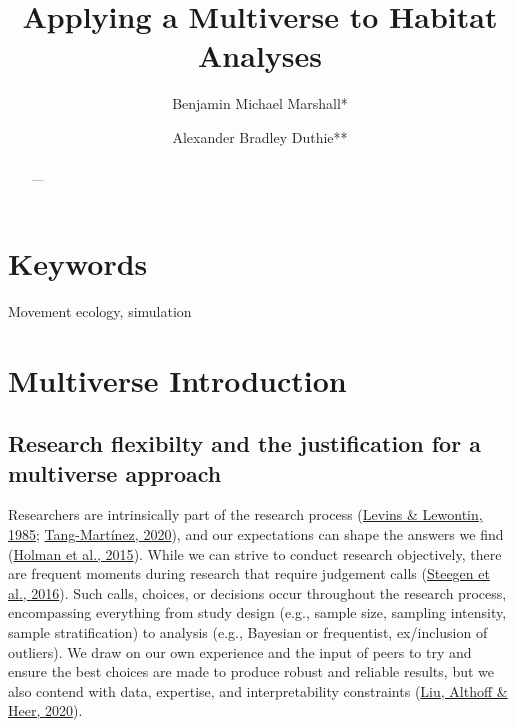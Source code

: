 \documentclass[10pt,a4paper]{article}
\begin{document}
\pagestyle{fancy}

\title{Applying a Multiverse to Habitat Analyses}
\author[1]{Benjamin Michael Marshall*}
\author[1]{Alexander Bradley Duthie**}


\maketitle
\thispagestyle{fancy}

\begin{abstract}

---

\end{abstract}

\section*{Keywords}

Movement ecology, simulation

\clearpage
\pagestyle{fancy}

\hypertarget{multiverse-introduction}{%
\section{Multiverse Introduction}\label{multiverse-introduction}}

\hypertarget{research-flexibilty-and-the-justification-for-a-multiverse-approach}{%
\subsection{Research flexibilty and the justification for a multiverse approach}\label{research-flexibilty-and-the-justification-for-a-multiverse-approach}}

Researchers are intrinsically part of the research process (\protect\hyperlink{ref-levins_dialectical_1985}{Levins \& Lewontin, 1985}; \protect\hyperlink{ref-tang-martinez_history_2020}{Tang-Martínez, 2020}), and our expectations can shape the answers we find (\protect\hyperlink{ref-holman_evidence_2015}{Holman et al., 2015}).
While we can strive to conduct research objectively, there are frequent moments during research that require judgement calls (\protect\hyperlink{ref-steegen_increasing_2016}{Steegen et al., 2016}).
Such calls, choices, or decisions occur throughout the research process, encompassing everything from study design (e.g., sample size, sampling intensity, sample stratification) to analysis (e.g., Bayesian or frequentist, ex/inclusion of outliers).
We draw on our own experience and the input of peers to try and ensure the best choices are made to produce robust and reliable results, but we also contend with data, expertise, and interpretability constraints (\protect\hyperlink{ref-liu_paths_2020}{Liu, Althoff \& Heer, 2020}).
\end{document}
